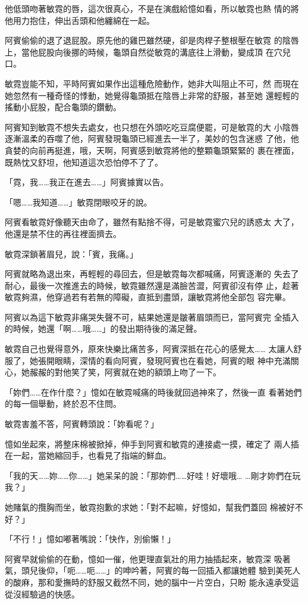 他低頭吻著敏霓的唇，這次很真心，不是在演戲給憶如看，所以敏霓也熱
情的將他用力抱住，伸出舌頭和他纏綿在一起。

阿賓偷偷的退了退屁股。原先他的雞巴雖然硬，卻是肉桿子整根壓在敏霓
的陰唇上，當他屁股向後挪的時候，龜頭自然從敏霓的溝底往上滑動，變成頂
在穴兒口。

敏霓豈能不知，平時阿賓如果作出這種危險動作，她非大叫阻止不可，然
而現在她忽然有一種奇怪的悸動，她覺得龜頭抵在陰唇上非常的舒服，甚至她
還輕輕的搖動小屁股，配合龜頭的鑽動。

阿賓知到敏霓不想失去處女，也只想在外頭吃吃豆腐便罷，可是敏霓的大
小陰唇逐漸溫柔的吞噬了他，阿賓發現龜頭已經進去一半了，美妙的包含迷惑
了他，他貪婪的向前再挺進，哦，天啊，阿賓感到敏霓將他的整顆龜頭緊緊的
裹在裡面，既熱忱又舒坦，他知道這次恐怕停不了了。

「霓，我……我正在進去……」阿賓據實以告。

「嗯……我知道……」敏霓閉眼咬牙的說。

阿賓看敏霓好像聽天由命了，雖然有點捨不得，可是敏霓蜜穴兒的誘惑太
大了，他還是禁不住的再往裡面擠去。

敏霓深鎖著眉兒，說：「賓，我痛。」

阿賓就略為退出來，再輕輕的尋回去，但是敏霓每次都喊痛，阿賓逐漸的
失去了耐心，最後一次推進去的時候，敏霓雖然還是滿臉苦澀，阿賓卻沒有停
止，趁著敏霓夠濕，他穿過若有若無的障礙，直抵到盡頭，讓敏霓將他全部包
容完畢。

阿賓以為這下敏霓非痛哭失聲不可，結果她還是皺著眉頭而已，當阿賓完
全插入的時候，她還「啊……哦……」的發出期待後的滿足聲。

敏霓自己也覺得意外，原來快樂比痛苦多，阿賓深抵在花心的感覺太……
太讓人舒服了，她張開眼睛，深情的看向阿賓，發現阿賓也在看她，阿賓的眼
神中充滿關心，她赧赧的對他笑了笑，阿賓就在她的額頭上吻了一下。

「妳們……在作什麼？」憶如在敏霓喊痛的時後就回過神來了，然後一直
看著她們的每一個舉動，終於忍不住問。

敏霓害羞不答，阿賓轉頭說：「妳看呢？」

憶如坐起來，將整床棉被掀掉，伸手到阿賓和敏霓的連接處一摸，確定了
兩人插在一起，當她縮回手，也看見了指端的鮮血。

「我的天……妳……你……」她呆呆的說：「那妳們……好哇！好壞哦…
…剛才妳們在玩我？」

她賭氣的攬胸而坐，敏霓抱歉的求她：「對不起嘛，好憶如，幫我們蓋回
棉被好不好？」

「不行！」憶如嘟著嘴說：「快作，別偷懶！」

阿賓早就偷偷的在動，憶如一催，他更理直氣壯的用力抽插起來，敏霓深
吸著氣，頭兒後仰，「呃……呃……」的呻吟著，阿賓的每一回插入都讓她體
驗到美死人的酸麻，那和愛撫時的舒服又截然不同，她的腦中一片空白，只盼
能永遠承受這從沒經驗過的快感。

